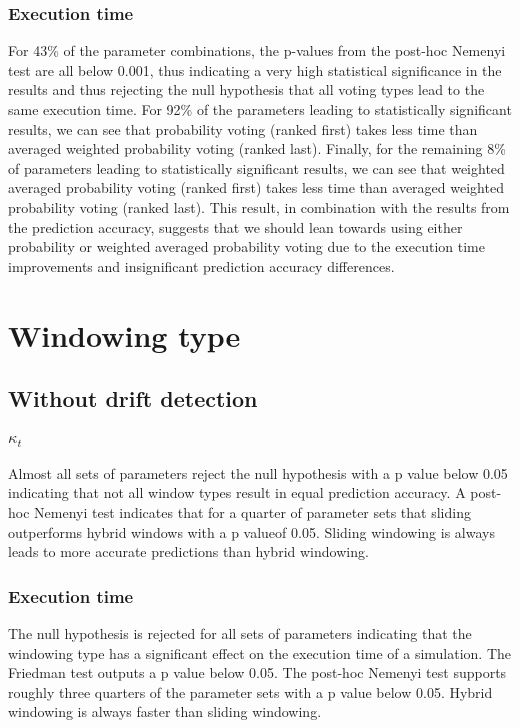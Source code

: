 \subsubsection{Execution time}
For 43\% of the parameter combinations, the p-values from the post-hoc Nemenyi test are all below 0.001, thus indicating a very high statistical significance in the results and thus rejecting the null hypothesis that all voting types lead to the same execution time. For 92\% of the parameters leading to statistically significant results, we can see that probability voting (ranked first) takes less time than averaged weighted probability voting (ranked last). Finally, for the remaining 8\% of parameters leading to statistically significant results, we can see that weighted averaged probability voting (ranked first) takes less time than averaged weighted probability voting (ranked last).
This result, in combination with the results from the prediction accuracy, suggests that we should lean towards using either probability or weighted averaged probability voting due to the execution time improvements and insignificant prediction accuracy differences.

\section{Windowing type}
\subsection{Without drift detection}
\subsubsection{$\kappa_t$}
Almost all sets of parameters reject the null hypothesis with a p value below 0.05 indicating that not all window types result in equal prediction accuracy. A post-hoc Nemenyi test indicates that for a quarter of parameter sets that sliding outperforms hybrid windows with a p valueof 0.05.
Sliding windowing is always leads to more accurate predictions than hybrid windowing.

\subsubsection{Execution time}
The null hypothesis is rejected for all sets of parameters indicating that the windowing type has a significant effect on the execution time of a simulation. The Friedman test outputs a p value below 0.05. The post-hoc Nemenyi test supports roughly three quarters of the parameter sets with a p value below 0.05. Hybrid windowing is always faster than sliding windowing.


